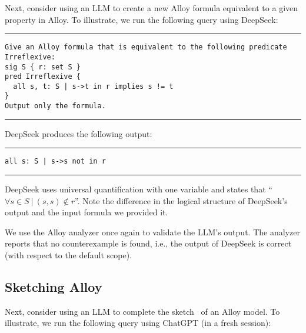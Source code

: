 Next, consider using an LLM to create a new Alloy formula equivalent
to a given property in Alloy.  To illustrate, we run the following
query using DeepSeek:

\noindent\hfil\rule{0.99\textwidth}{1pt}\hfil

\vspace*{-2ex}
\begin{CodeOut}
\begin{verbatim}
Give an Alloy formula that is equivalent to the following predicate Irreflexive:
sig S { r: set S }
pred Irreflexive {
  all s, t: S | s->t in r implies s != t
}
Output only the formula.
\end{verbatim}
\end{CodeOut}

\vspace*{-3ex}

\noindent\hfil\rule{0.99\textwidth}{1pt}\hfil

\noindent{}DeepSeek produces the following output:

\noindent\hfil\rule{0.99\textwidth}{1pt}\hfil

\vspace*{-2ex}
\begin{CodeOut}
\begin{verbatim}
all s: S | s->s not in r
\end{verbatim}
\end{CodeOut}
\vspace*{-3ex}

\noindent\hfil\rule{0.99\textwidth}{1pt}\hfil

\noindent{}DeepSeek uses universal quantification with one variable
and states that ``$\forall s\in S ~|~ (s, s) \not\in r$''.  Note the
difference in the logical structure of DeepSeek's output and the input
formula we provided it.

We use the Alloy analyzer once again to validate the LLM's output.
The analyzer reports that no counterexample is found, i.e., the output
of DeepSeek is correct (with respect to the default scope).

\subsection{Sketching Alloy}
\vspace*{-1ex}

Next, consider using an LLM to complete the
sketch~\cite{SolarLazemaPhD2008,WangETALABZ2018ASketch} of an Alloy
model.  To illustrate, we run the following query using ChatGPT (in a
fresh session):

